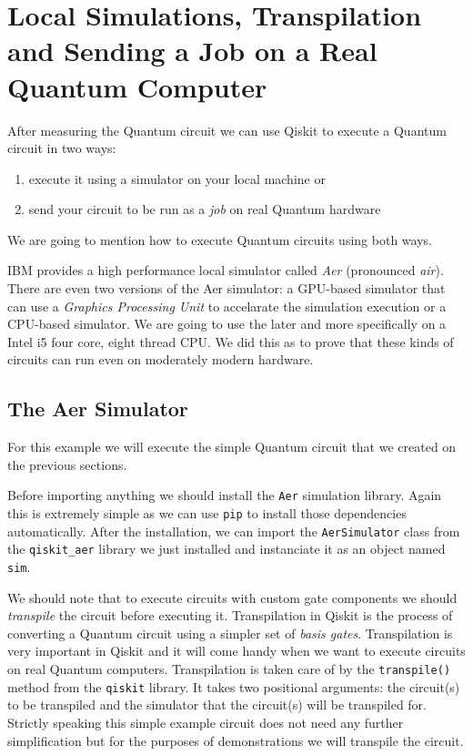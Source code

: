\section{Local Simulations, Transpilation and Sending a Job on a Real Quantum Computer}

After measuring the Quantum circuit we can use Qiskit to execute a Quantum circuit in two ways:

\begin{enumerate}
    \item execute it using a simulator on your local machine or
    \item send your circuit to be run as a \textit{job} on real Quantum hardware
\end{enumerate}

We are going to mention how to execute Quantum circuits using both ways.

IBM provides a high performance local simulator called \textit{Aer} (pronounced \textit{air}).
There are even two versions of the Aer simulator: a GPU-based simulator that can use a 
\textit{Graphics Processing Unit} to accelarate the simulation execution or a CPU-based
simulator. We are going to use the later and more specifically on a Intel i5 four core, eight thread
CPU. We did this as to prove that these kinds of circuits can run even on moderately modern hardware.


\subsection{The Aer Simulator}
For this example we will execute the simple Quantum circuit that we created on the previous sections.

Before importing anything we should install the \verb|Aer| simulation library. Again this is extremely
simple as we can use \verb|pip| to install those dependencies automatically. After the installation,
we can import the \verb|AerSimulator| class from the \verb|qiskit_aer| library we just installed and
instanciate it as an object named \verb|sim|.

We should note that to execute circuits with custom gate components we should \textit{transpile} the
circuit before executing it. Transpilation in Qiskit is the process of converting a Quantum circuit
using a simpler set of \textit{basis gates}. Transpilation is very important in Qiskit and it will 
come handy when we want to execute circuits on real Quantum computers. Transpilation is taken care
of by the \verb|transpile()| method from the \verb|qiskit| library. It takes two positional arguments:
the circuit(s) to be transpiled and the simulator that the circuit(s) will be transpiled for. Strictly
speaking this simple example circuit does not need any further simplification but for the purposes of
demonstrations we will transpile the circuit.

